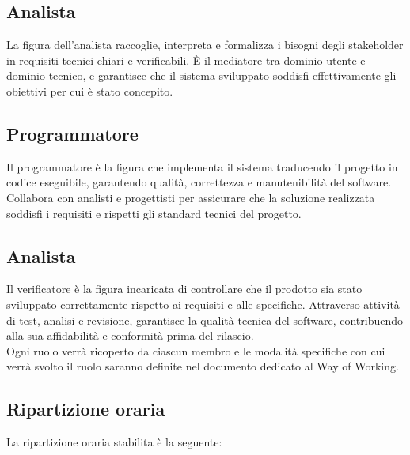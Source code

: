 \documentclass[a4paper,12pt]{article}
\begin{document}
\subsection*{Analista}
La figura dell'analista raccoglie, interpreta e formalizza i bisogni degli stakeholder in requisiti tecnici chiari e verificabili. È il mediatore tra dominio utente e dominio tecnico, e garantisce che il sistema sviluppato soddisfi effettivamente gli obiettivi per cui è stato concepito.

\subsection*{Programmatore}
Il programmatore è la figura che implementa il sistema traducendo il progetto in codice eseguibile, garantendo qualità, correttezza e manutenibilità del software. Collabora con analisti e progettisti per assicurare che la soluzione realizzata soddisfi i requisiti e rispetti gli standard tecnici del progetto.

\subsection*{Analista}
Il verificatore è la figura incaricata di controllare che il prodotto sia stato sviluppato correttamente rispetto ai requisiti e alle specifiche. Attraverso attività di test, analisi e revisione, garantisce la qualità tecnica del software, contribuendo alla sua affidabilità e conformità prima del rilascio.\\

\noindent Ogni ruolo verrà ricoperto da ciascun membro e le modalità specifiche con cui verrà svolto il ruolo saranno definite nel documento dedicato al Way of Working.

\newpage

\subsection{Ripartizione oraria}
La ripartizione oraria stabilita è la seguente:
\end{document}
